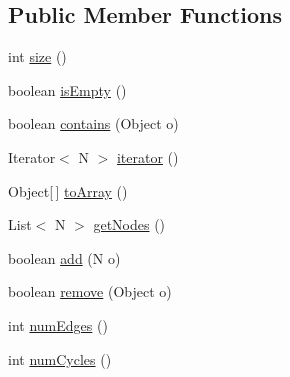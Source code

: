 \subsection*{Public Member Functions}
\begin{DoxyCompactItemize}
\item 
int \hyperlink{interfaceorg_1_1tzi_1_1use_1_1graph_1_1_directed_graph_3_01_n_00_01_e_01extends_01_directed_edge_3_01_n_01_4_01_4_a701778e62c2b2d020fc0d12162acd843}{size} ()
\item 
boolean \hyperlink{interfaceorg_1_1tzi_1_1use_1_1graph_1_1_directed_graph_3_01_n_00_01_e_01extends_01_directed_edge_3_01_n_01_4_01_4_aebcaf99cbfd0211d045e4ff4b4e203ef}{is\-Empty} ()
\item 
boolean \hyperlink{interfaceorg_1_1tzi_1_1use_1_1graph_1_1_directed_graph_3_01_n_00_01_e_01extends_01_directed_edge_3_01_n_01_4_01_4_a427a070aaaaf646c88f3f02340ba3e75}{contains} (Object o)
\item 
Iterator$<$ N $>$ \hyperlink{interfaceorg_1_1tzi_1_1use_1_1graph_1_1_directed_graph_3_01_n_00_01_e_01extends_01_directed_edge_3_01_n_01_4_01_4_aea17629cdca0561d2a3a87557c27fb3e}{iterator} ()
\item 
Object\mbox{[}$\,$\mbox{]} \hyperlink{interfaceorg_1_1tzi_1_1use_1_1graph_1_1_directed_graph_3_01_n_00_01_e_01extends_01_directed_edge_3_01_n_01_4_01_4_a8656d4e0f67e0c10ad22b247c012ce95}{to\-Array} ()
\item 
List$<$ N $>$ \hyperlink{interfaceorg_1_1tzi_1_1use_1_1graph_1_1_directed_graph_3_01_n_00_01_e_01extends_01_directed_edge_3_01_n_01_4_01_4_a9ef999fa1134a2064b9429eb26ca58df}{get\-Nodes} ()
\item 
boolean \hyperlink{interfaceorg_1_1tzi_1_1use_1_1graph_1_1_directed_graph_3_01_n_00_01_e_01extends_01_directed_edge_3_01_n_01_4_01_4_aa0fb217f7d084ba5e2d90a9de154d8a1}{add} (N o)
\item 
boolean \hyperlink{interfaceorg_1_1tzi_1_1use_1_1graph_1_1_directed_graph_3_01_n_00_01_e_01extends_01_directed_edge_3_01_n_01_4_01_4_a02bbaad91329cc9e3fd7259299d163d9}{remove} (Object o)
\item 
int \hyperlink{interfaceorg_1_1tzi_1_1use_1_1graph_1_1_directed_graph_3_01_n_00_01_e_01extends_01_directed_edge_3_01_n_01_4_01_4_a8be2f999478af42a4c64866b3e66c360}{num\-Edges} ()
\item 
int \hyperlink{interfaceorg_1_1tzi_1_1use_1_1graph_1_1_directed_graph_3_01_n_00_01_e_01extends_01_directed_edge_3_01_n_01_4_01_4_aab82ca71350075caf3262a6333bcf49a}{num\-Cycles} ()
\item 

\end{DoxyCompactItemize}
